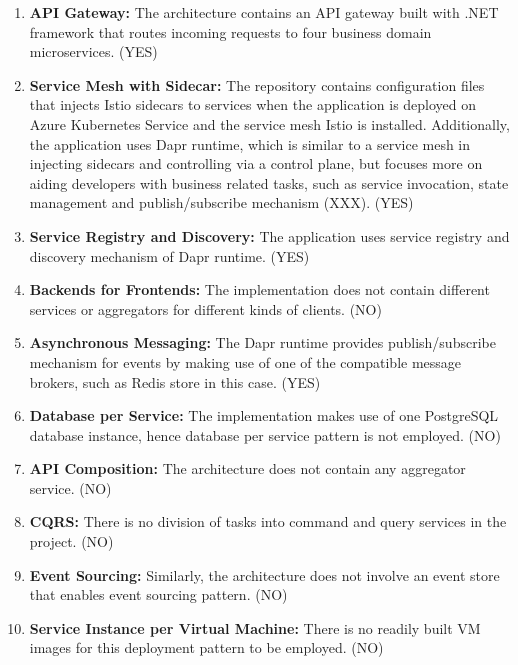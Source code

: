 \documentclass{Configuration_Files/PoliMi3i_thesis}
\begin{document}
\begin{enumerate}
    \item \textbf{API Gateway:} The architecture contains an API gateway built with .NET framework that routes incoming requests to four business domain microservices. (YES)
    
    \item \textbf{Service Mesh with Sidecar:} The repository contains configuration files that injects Istio sidecars to services when the application is deployed on Azure Kubernetes Service and the service mesh Istio is installed.
    Additionally, the application uses Dapr runtime, which is similar to a service mesh in injecting sidecars and controlling via a control plane, but focuses more on aiding developers with business related tasks, such as service invocation, state management and publish/subscribe mechanism (XXX). (YES)
    
    \item \textbf{Service Registry and Discovery:} The application uses service registry and discovery mechanism of Dapr runtime. (YES)
    
    \item \textbf{Backends for Frontends:} The implementation does not contain different services or aggregators for different kinds of clients. (NO)
    
    \item \textbf{Asynchronous Messaging:} The Dapr runtime provides publish/subscribe mechanism for events by making use of one of the compatible message brokers, such as Redis store in this case. (YES)
    
    \item \textbf{Database per Service:} The implementation makes use of one PostgreSQL database instance, hence database per service pattern is not employed. (NO)
    
    \item \textbf{API Composition:} The architecture does not contain any aggregator service. (NO)
    
    \item \textbf{CQRS:} There is no division of tasks into command and query services in the project. (NO)
    
    \item \textbf{Event Sourcing:} Similarly, the architecture does not involve an event store that enables event sourcing pattern. (NO)
    
    \item \textbf{Service Instance per Virtual Machine:} There is no readily built VM images for this deployment pattern to be employed. (NO)
    

\end{enumerate}
\end{document}
